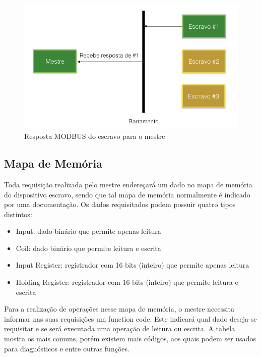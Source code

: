 \begin{figure}[H]
        \begin{center}
                \includegraphics[width=\textwidth,natwidth=1024,natheight=768]{assets/images/modbus-req-2.png}
                \caption{Resposta MODBUS do escravo para o mestre}
                \label{fig:modbus-req-2}
        \end{center}
\end{figure}

\subsection{Mapa de Memória}

Toda requisição realizada pelo mestre endereçará um dado no mapa de memória do dispositivo escravo, sendo que tal mapa de memória normalmente é indicado por uma documentação. Os dados requisitados podem possuir quatro tipos distintos:

\begin{itemize}
  \item Input: dado binário que permite apenas leitura
  \item Coil: dado binário que permite leitura e escrita
  \item Input Register: registrador com 16 bits (inteiro) que permite apenas leitura
  \item Holding Register: registrador com 16 bits (inteiro) que permite leitura e escrita
\end{itemize}

Para a realização de operações nesse mapa de memória, o mestre necessita informar nas suas requisições um function code. Este indicará qual dado deseja-se requisitar e se será executada uma operação de leitura ou escrita. A tabela mostra os mais comuns, porém existem mais códigos, aos quais podem ser usados para diagnósticos e entre outras funções.

